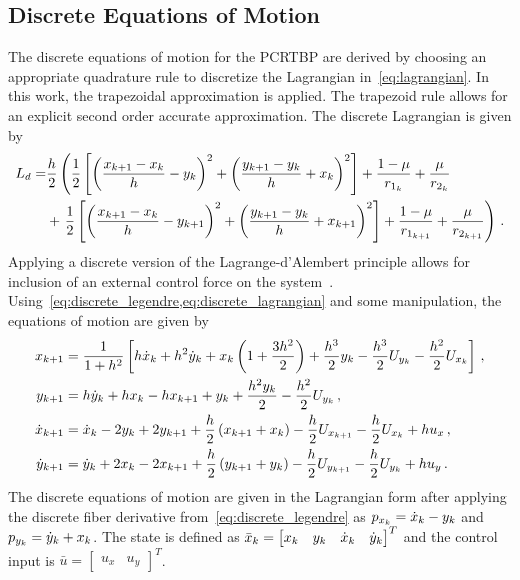 \documentclass[letterpaper, paper,11pt]{AAS}		%
\begin{document}
\subsection{Discrete Equations of Motion}
The discrete equations of motion for the PCRTBP are derived by choosing an appropriate quadrature rule to discretize the Lagrangian in~\cref{eq:lagrangian}. 
In this work, the trapezoidal approximation is applied.
The trapezoid rule allows for an explicit second order accurate approximation.
The discrete Lagrangian is given by
\begin{align}\label{eq:discrete_lagrangian}
	L_d = &\frac{h}{2} \left( \frac{1}{2} \bracket{\left(  \frac{\xkp - \xk}{h} -\yk \right)^2 + \left( \frac{\ykp - \yk}{h} + \xk \right)^2} + \frac{1 - \mu}{r_{1_k}} + \frac{\mu}{r_{2_k}} \right. \nonumber \\ 
		& + \left. \frac{1}{2} \bracket{\left(  \frac{\xkp - \xk}{h} -\ykp \right)^2 + \left( \frac{\ykp - \yk}{h} + \xkp \right)^2} + \frac{1-\mu}{r_{1_{k+1}}} + \frac{\mu}{r_{2_{k+1}}}  \right) \, .
\end{align}
Applying a discrete version of the Lagrange-d'Alembert principle allows for inclusion of an external control force on the system~\cite{marsden2001}.
Using~\cref{eq:discrete_legendre,eq:discrete_lagrangian} and some manipulation, the equations of motion are given by
\begin{subequations}\label{eq:discrete_eoms}
\begin{align}
	\xkp &= \frac{1}{1+ h^2} \bracket{h \dot{x}_k + h^2 \dot{y}_k  + \xk \parenth{1+ \frac{3h^2}{2}} + \frac{h^3}{2} \yk - \frac{h^3}{2} U_{y_k} - \frac{h^2}{2} U_{x_k} } \label{eq:xkp} \, ,\\
	\ykp &= h \dot{y}_k + h \xk - h \xkp + \yk + \frac{h^2 \yk}{2} - \frac{h^2 }{2} U_{y_k} \label{eq:ykp} \, ,\\
	\dot{x}_{k+1} &= \dot{x}_k - 2 \yk + 2 \ykp + \frac{h}{2} \parenth{\xkp + \xk} - \frac{h}{2} U_{\xkp} - \frac{h}{2} U_{\xk} + h u_x \label{eq:xdotkp}\, ,\\
	\dot{y}_{k+1} &= \dot{y}_{k} + 2 \xk - 2 \xkp + \frac{h}{2} \parenth{\ykp + \yk} - \frac{h}{2} U_{\ykp} - \frac{h}{2} U_{\yk} + h u_y \label{eq:ydotkp} \, .
\end{align}
\end{subequations}
The discrete equations of motion are given in the Lagrangian form after applying the discrete fiber derivative from~\cref{eq:discrete_legendre} as \( p_{x_k} = \dot{x}_k - y_{k} \) and \( p_{y_{k}} = \dot{y}_k + x_k \).
The state is defined as \( \bar{ x}_k = \begin{bmatrix} x_k & y_{k} & \dot{x}_k & \dot{y}_k \end{bmatrix}^T\) and the control input is \( \bar{u} = \begin{bmatrix} u_x & u_y \end{bmatrix}^T \).
\end{document}
